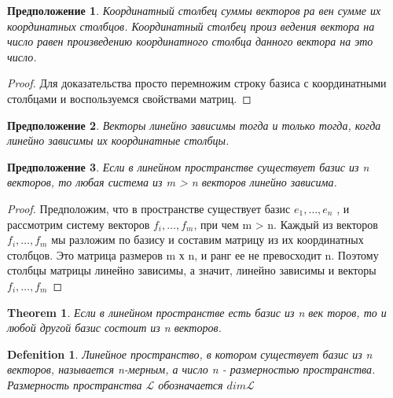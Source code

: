 \documentclass[11pt; a4paper]{report}
\theoremstyle{plain} %
\newtheorem{theorem}{Theorem}
\newtheorem{sug}{Предположение}[section]
\theoremstyle{defenition}
\newtheorem{glob_def}{Defenition}
\theoremstyle{remark}
\begin{document}
\begin{sug}\label{sug6.6}
Координатный столбец суммы векторов ра­ вен сумме их координатных столбцов. Координатный столбец произ­ ведения вектора на число равен произведению координатного столбца данного вектора на это число.
\end{sug}
\begin{proof}
Для доказательства просто перемножим строку базиса с координатными столбцами и воспользуемся свойствами матриц.
\end{proof}

\begin{sug}\label{sug6.7}
Векторы линейно зависимы тогда и только тогда, когда линейно зависимы их координатные столбцы.
\end{sug}

\begin{sug}\label{sug6.8}
Если в линейном пространстве существует базис из n векторов, то любая система из m > n векторов линейно
зависима.
\end{sug}
\begin{proof}
Предположим, что в пространстве сущест­вует базис $e_1, \ldots, e_n$ , и рассмотрим систему векторов 
$ f_i , \ldots, f_m$, при­ чем m > n. Каждый из векторов $f_i , \ldots, f_m$ мы разложим по базису и составим матрицу из их координатных столбцов. Это матрица раз­меров m х n, и ранг ее не превосходит n. Поэтому столбцы матрицы линейно зависимы, а значит, линейно зависимы и векторы $ f_i , \ldots, f_m$
\end{proof}
\begin{theorem}\label{t6.1}
Если в линейном пространстве есть базис из n век­ торов, то и любой другой базис состоит из n векторов.
\end{theorem}

\begin{glob_def}
Линейное пространство, в котором существует базис из n векторов, называется n-мерным, а число n - размерностью пространства. Размерность пространства $\mathscr{L}$ обозначается $dim\mathscr{L}$
\end{glob_def}
\end{document}
